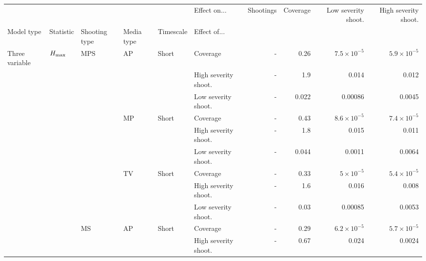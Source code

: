 \documentclass[article]{standalone}
\begin{document}
\begin{tabular}{llllllrrrr}
\toprule
             &                   &    &    &       & Effect on... &            Shootings &  Coverage &  Low severity shoot. &  High severity shoot. \\
Model type & Statistic & Shooting type & Media type & Timescale & Effect of... &                      &           &                      &                       \\
\midrule
Three variable & $H_{\rm{max}}$ & MPS & AP & Short & Coverage &                    - &      0.26 & $7.5 \times 10^{-5}$ &  $5.9 \times 10^{-5}$ \\
             &                   &    &    &       & High severity shoot. &                    - &       1.9 &                0.014 &                 0.012 \\
             &                   &    &    &       & Low severity shoot. &                    - &     0.022 &              0.00086 &                0.0045 \\
             &                   &    & MP & Short & Coverage &                    - &      0.43 & $8.6 \times 10^{-5}$ &  $7.4 \times 10^{-5}$ \\
             &                   &    &    &       & High severity shoot. &                    - &       1.8 &                0.015 &                 0.011 \\
             &                   &    &    &       & Low severity shoot. &                    - &     0.044 &               0.0011 &                0.0064 \\
             &                   &    & TV & Short & Coverage &                    - &      0.33 &   $5 \times 10^{-5}$ &  $5.4 \times 10^{-5}$ \\
             &                   &    &    &       & High severity shoot. &                    - &       1.6 &                0.016 &                 0.008 \\
             &                   &    &    &       & Low severity shoot. &                    - &      0.03 &              0.00085 &                0.0053 \\
             &                   & MS & AP & Short & Coverage &                    - &      0.29 & $6.2 \times 10^{-5}$ &  $5.7 \times 10^{-5}$ \\
             &                   &    &    &       & High severity shoot. &                    - &      0.67 &                0.024 &                0.0024 \\

\end{tabular}
\end{document}
